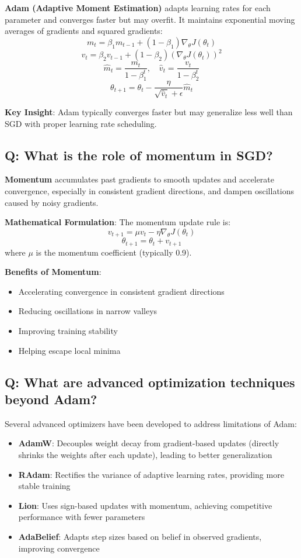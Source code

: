 \textbf{Adam (Adaptive Moment Estimation)} adapts learning rates for each parameter and converges faster but may overfit. It maintains exponential moving averages of gradients and squared gradients:
\[
	m_t = \beta_1 m_{t-1} + (1-\beta_1) \nabla_\theta J(\theta_t)
\]
\[
	v_t = \beta_2 v_{t-1} + (1-\beta_2) (\nabla_\theta J(\theta_t))^2
\]
\[
	\hat{m}_t = \frac{m_t}{1-\beta_1^t}, \quad \hat{v}_t = \frac{v_t}{1-\beta_2^t}
\]
\[
	\theta_{t+1} = \theta_t - \frac{\eta}{\sqrt{\hat{v}_t} + \epsilon} \hat{m}_t
\]

\textbf{Key Insight}: Adam typically converges faster but may generalize less well than SGD with proper learning rate scheduling.

\subsection*{\textcolor{primaryteal}{Q: What is the role of momentum in SGD?}}
\textbf{Momentum} accumulates past gradients to smooth updates and accelerate convergence, especially in consistent gradient directions, and dampen oscillations caused by noisy gradients.

\textbf{Mathematical Formulation}: The momentum update rule is:
\[
	v_{t+1} = \mu v_t - \eta \nabla_\theta J(\theta_t)
\]
\[
	\theta_{t+1} = \theta_t + v_{t+1}
\]
where $\mu$ is the momentum coefficient (typically 0.9).

\textbf{Benefits of Momentum}:
\begin{itemize}
	\item Accelerating convergence in consistent gradient directions
	\item Reducing oscillations in narrow valleys
	\item Improving training stability
	\item Helping escape local minima
\end{itemize}

\subsection*{\textcolor{primaryteal}{Q: What are advanced optimization techniques beyond Adam?}}
Several advanced optimizers have been developed to address limitations of Adam:

\begin{itemize}
	\item \textbf{AdamW}: Decouples weight decay from gradient-based updates (directly shrinks the weights after each update), leading to better generalization
	\item \textbf{RAdam}: Rectifies the variance of adaptive learning rates, providing more stable training
	\item \textbf{Lion}: Uses sign-based updates with momentum, achieving competitive performance with fewer parameters
	\item \textbf{AdaBelief}: Adapts step sizes based on belief in observed gradients, improving convergence
\end{itemize}

